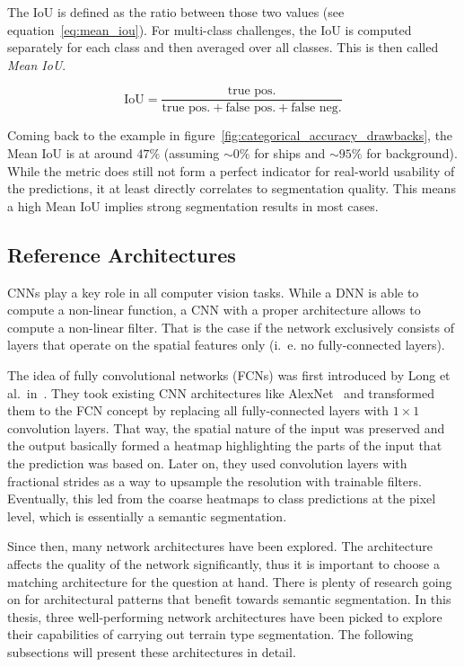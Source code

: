 The IoU is defined as the ratio between those two values (see equation~\ref{eq:mean_iou}). For multi-class challenges, the IoU is computed separately for each class and then averaged over all classes. This is then called \emph{Mean IoU}.

\begin{equation}
    \label{eq:mean_iou}
    \text{IoU} = \frac{\text{true pos.}}{\text{true pos.}+\text{false pos.}+\text{false neg.}}
\end{equation}

Coming back to the example in figure~\ref{fig:categorical_accuracy_drawbacks}, the Mean IoU is at around $47\%$ (assuming $\sim 0\%$ for ships and $\sim 95\%$ for background). While the metric does still not form a perfect indicator for real-world usability of the predictions, it at least directly correlates to segmentation quality. This means a high Mean IoU implies strong segmentation results in most cases.

\subsection{Reference Architectures}
\label{sec:ref_archs}
CNNs play a key role in all computer vision tasks. While a DNN is able to compute a non-linear function, a CNN with a proper architecture allows to compute a non-linear filter. That is the case if the network exclusively consists of layers that operate on the spatial features only (i.~e. no fully-connected layers).

The idea of fully convolutional networks (FCNs) was first introduced by Long et al.\ in~\cite{fcn15}. They took existing CNN architectures like AlexNet~\cite{alexnet12} and transformed them to the FCN concept by replacing all fully-connected layers with $1\times 1$ convolution layers. That way, the spatial nature of the input was preserved and the output basically formed a heatmap highlighting the parts of the input that the prediction was based on. Later on, they used convolution layers with fractional strides as a way to upsample the resolution with trainable filters. Eventually, this led from the coarse heatmaps to class predictions at the pixel level, which is essentially a semantic segmentation.

Since then, many network architectures have been explored. The architecture affects the quality of the network significantly, thus it is important to choose a matching architecture for the question at hand. There is plenty of research going on for architectural patterns that benefit towards semantic segmentation. In this thesis, three well-performing network architectures have been picked to explore their capabilities of carrying out terrain type segmentation. The following subsections will present these architectures in detail.

